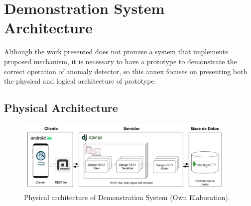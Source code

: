  

\chapter{Demonstration System Architecture} %

\label{chapter:AppendixB} %

Although the work presented does not promise a system that implements proposed mechanism, it is necessary to have a prototype to demonstrate the correct operation of anomaly detector, so this annex focuses on presenting both the physical and logical architecture of prototype.

\section{Physical Architecture}

\begin{figure}[h!]
  \begin{center}	\includegraphics[width=0.95\textwidth, fbox]{imagenes/Apendices/Arquitectura}
  \caption{Physical architecture of Demonstration System (Own Elaboration).}
  \label{fig:arq_fis}  
  \end{center}
\end{figure}

